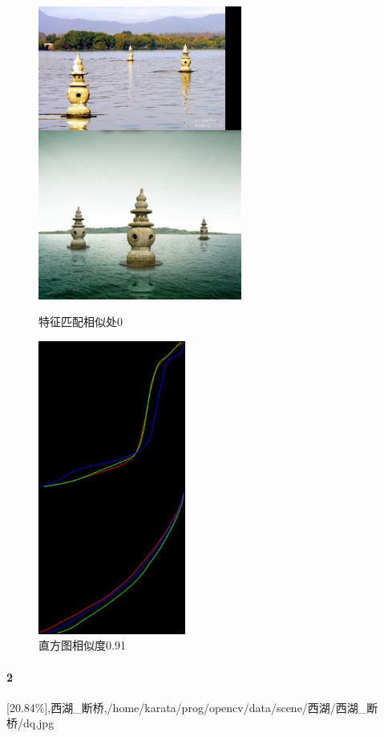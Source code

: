 \begin{figure}[htb]
\begin{minipage}[t]{0.5\linewidth}
\centering
\includegraphics[height=3.8in]{三映.jpg.d/im1sift.jpg}
\caption{特征匹配相似处0}
\label{fig:side:a}
\end{minipage}%
\begin{minipage}[t]{0.5\linewidth}
\centering
\includegraphics[height=3.8in]{三映.jpg.d/im1hist2.jpg}
\caption{直方图相似度0.91}
\label{fig:side:a}
\end{minipage}%
\end{figure}

\clearpage
\paragraph{2}
[20.84\%],西湖_断桥,/home/karata/prog/opencv/data/scene/西湖/西湖_断桥/dq.jpg

